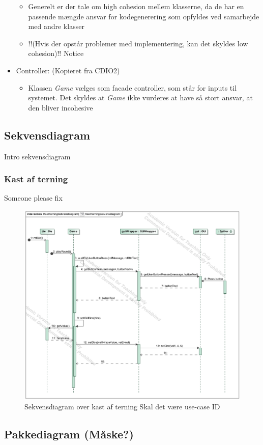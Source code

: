 \documentclass[../main.tex]{subfiles}
\begin{document}
\begin{flushleft}
\begin{itemize}
\begin{itemize}
        \item Generelt er der tale om high cohesion mellem klasserne, da de har en passende mængde ansvar for kodegenerering som opfyldes ved samarbejde med andre klasser
        \item \TODO !!(Hvis der opstår problemer med implementering, kan det skyldes low cohesion)!! Notice
    \end{itemize}
    \item Controller: (Kopieret fra CDIO2)
    \begin{itemize}
        \item Klassen \textit{Game} vælges som facade controller, som står for inputs til systemet. Det skyldes at \textit{Game} ikke vurderes at have så stort ansvar, at den bliver incohesive
    \end{itemize}
\end{itemize}



\subsection{Sekvensdiagram }

\TODO Intro sekvensdiagram


\subsubsection{Kast af terning}
\TODO Someone please fix
\begin{figure}[H]
    \centering
    \includegraphics[width=0.7\linewidth]{figures/sekvensDiagrammer/KastTerningSekvensDiagram.png}
    \caption{Sekvensdiagram over kast af terning \TODO Skal det være use-case ID}
    \label{fig:sekvensKastTerning}
\end{figure}

\subsection{Pakkediagram (Måske?) }

\end{flushleft}
\end{document}
